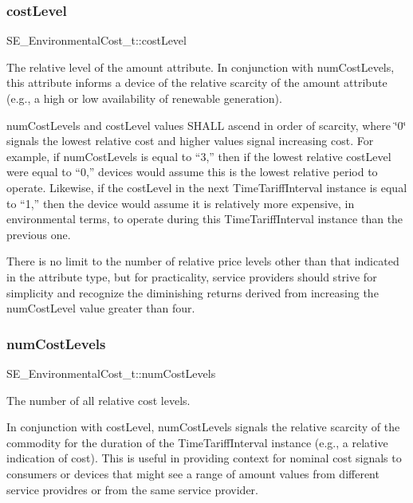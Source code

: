 \subsubsection{\texorpdfstring{cost\+Level}{costLevel}}
{\footnotesize\ttfamily S\+E\+\_\+\+Environmental\+Cost\+\_\+t\+::cost\+Level}

The relative level of the amount attribute. In conjunction with num\+Cost\+Levels, this attribute informs a device of the relative scarcity of the amount attribute (e.\+g., a high or low availability of renewable generation).

num\+Cost\+Levels and cost\+Level values S\+H\+A\+LL ascend in order of scarcity, where \char`\"{}0\char`\"{} signals the lowest relative cost and higher values signal increasing cost. For example, if num\+Cost\+Levels is equal to “3,” then if the lowest relative cost\+Level were equal to “0,” devices would assume this is the lowest relative period to operate. Likewise, if the cost\+Level in the next Time\+Tariff\+Interval instance is equal to “1,” then the device would assume it is relatively more expensive, in environmental terms, to operate during this Time\+Tariff\+Interval instance than the previous one.

There is no limit to the number of relative price levels other than that indicated in the attribute type, but for practicality, service providers should strive for simplicity and recognize the diminishing returns derived from increasing the num\+Cost\+Level value greater than four. \mbox{\label{group__EnvironmentalCost_ga47696c1d43b551dfb6cc492460500ea1}} 
\subsubsection{\texorpdfstring{num\+Cost\+Levels}{numCostLevels}}
{\footnotesize\ttfamily S\+E\+\_\+\+Environmental\+Cost\+\_\+t\+::num\+Cost\+Levels}

The number of all relative cost levels.

In conjunction with cost\+Level, num\+Cost\+Levels signals the relative scarcity of the commodity for the duration of the Time\+Tariff\+Interval instance (e.\+g., a relative indication of cost). This is useful in providing context for nominal cost signals to consumers or devices that might see a range of amount values from different service providres or from the same service provider. 